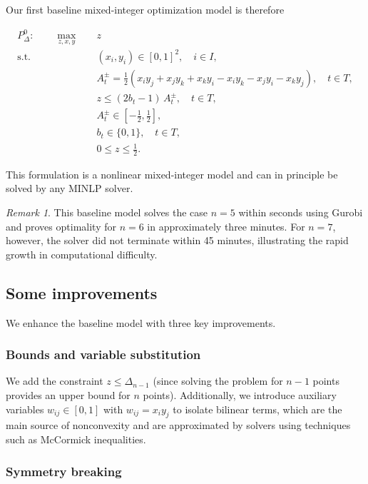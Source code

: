 \documentclass[11pt,a4paper]{article}
\theoremstyle{plain}
\theoremstyle{definition}
\theoremstyle{remark}
\newtheorem{remark}{Remark}
\begin{document}
Our first baseline mixed-integer optimization model is therefore

\begin{align*}
P_\Delta^0:\qquad
\max_{z,x,y}\quad & z \\
\text{s.t.}\quad 
& (x_i,y_i)\in[0,1]^2, \quad i\in I,\\
& A_t^{\pm}
=
\frac{1}{2}\left(
x_i y_j + x_j y_k + x_k y_i
-
x_i y_k - x_j y_i - x_k y_j
\right), 
\quad t\in T,\\
& z \le (2b_t - 1)\, A_t^{\pm}, \quad t\in T,\\
& A_t^{\pm}\in\left[-\frac{1}{2}, \frac{1}{2}\right],\\
& b_t \in \{0,1\}, \quad t\in T,\\
&  0 \le z \le \frac{1}{2}.
\end{align*}

This formulation is a nonlinear mixed-integer model
and can in principle be solved by any MINLP solver.

\begin{remark}
This baseline model solves the case $n=5$ within seconds using Gurobi and 
proves optimality for $n=6$ in approximately three minutes.
For $n=7$, however, the solver did not terminate within 45 minutes,
illustrating the rapid growth in computational difficulty.
\end{remark}

\subsection{Some improvements}\label{sec:MIPmodelImproved}

We enhance the baseline model with three key improvements.

\subsubsection{Bounds and variable substitution}

We add the constraint $z \le \Delta_{n-1}$ (since solving the problem for $n-1$ points provides an upper bound for $n$ points). Additionally, we introduce auxiliary variables $w_{ij} \in [0,1]$ with $w_{ij} = x_i y_j$ to isolate bilinear terms, which are the main source of nonconvexity and are approximated by solvers using techniques such as McCormick inequalities.

\subsubsection{Symmetry breaking}\label{sec: symmetry breaking}
\end{document}
